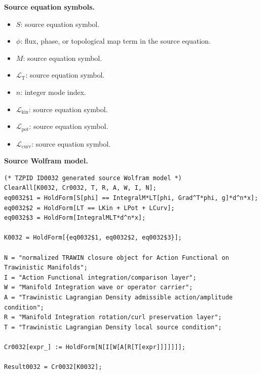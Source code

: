 \begin{minipage}[t]{0.49\linewidth}
\begingroup
\small
\raggedright
\textbf{Source equation symbols.}\par
\begin{itemize}[leftmargin=1.35em,itemsep=1pt,topsep=1pt,parsep=0pt]
    \item $S$: source equation symbol.
    \item $\phi$: flux, phase, or topological map term in the source equation.
    \item $M$: source equation symbol.
    \item $\mathcal{L}_{\mathrm{T}}$: source equation symbol.
    \item $n$: integer mode index.
    \item $\mathcal{L}_{\mathrm{kin}}$: source equation symbol.
    \item $\mathcal{L}_{\mathrm{pot}}$: source equation symbol.
    \item $\mathcal{L}_{\mathrm{curv}}$: source equation symbol.
\end{itemize}
\endgroup
\end{minipage}\hfill
\begin{minipage}[t]{0.47\linewidth}
\begingroup
\scriptsize
\raggedright
\textbf{Source Wolfram model.}\par
\begin{Verbatim}[fontsize=\tiny,breaklines=true,breakanywhere=true]
(* TZPID ID0032 generated source Wolfram model *)
ClearAll[K0032, Cr0032, T, R, A, W, I, N];
eq0032$1 = HoldForm[S[phi] == IntegralM*LT[phi, Grad^T*phi, g]*d^n*x];
eq0032$2 = HoldForm[LT == LKin + LPot + LCurv];
eq0032$3 = HoldForm[IntegralMLT*d^n*x];

K0032 = HoldForm[{eq0032$1, eq0032$2, eq0032$3}];

N = "normalized TRAWIN closure object for Action Functional on Trawinistic Manifolds";
I = "Action Functional integration/comparison layer";
W = "Manifold Integration wave or operator carrier";
A = "Trawinistic Lagrangian Density admissible action/amplitude condition";
R = "Manifold Integration rotation/curl preservation layer";
T = "Trawinistic Lagrangian Density local source condition";

Cr0032[expr_] := HoldForm[N[I[W[A[R[T[expr]]]]]]];

Result0032 = Cr0032[K0032];
\end{Verbatim}
\endgroup
\end{minipage}

